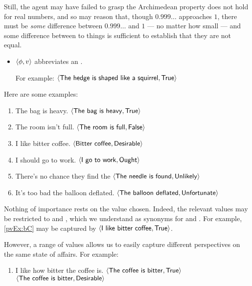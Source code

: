 \begin{note}
{    Still, the agent may have failed to grasp the Archimedean property does not hold for real numbers, and so may reason that, though \(0.999\dots\) approaches \(1\), there must be \emph{some} difference between \(0.999\dots\) and \(1\) --- no matter how small --- and some difference between to things is sufficient to establish that they are not equal.
  }

  \begin{notation}[\evalN{3}]%
    \vspace{-\baselineskip}
    \begin{itemize}[leftmargin=*]
    \item
      \(\langle \phi, v \rangle\) abbreviates an .

      For example:
      \(\pv{\prop{The hedge is shaped like a squirrel}}{\val{True}}\)
    \end{itemize}
    \vspace{-\baselineskip}
  \end{notation}
\end{note}

\begin{note}
  Here are some examples:

  \begin{enumerate}[label=\arabic*., ref=(\arabic*),noitemsep, series=propValExC]
  \item
    The bag is heavy.%
    \hfill%
    \(\pv{\prop{The bag is heavy}}{\val{True}}\)
  \item
    The room isn't full.%
    \hfill%
    \(\pv{\prop{The room is full}}{\val{False}}\)
  \item
    \label{pvEx:bC}
    I like bitter coffee.%
    \hfill%
    \(\pv{\prop{Bitter coffee}}{\val{Desirable}}\)
  \item
    I should go to work.%
    \hfill%
    \(\pv{\prop{I go to work}}{\val{Ought}}\)
  \item
    There's no chance they find the%
    \hfill%
    \(\pv{\prop{The needle is found}}{\val{Unlikely}}\)
  \item
    It's too bad the balloon deflated.%
    \hfill%
    \(\pv{\prop{The balloon deflated}}{\val{Unfortunate}}\)
  \end{enumerate}

  Nothing of importance rests on the value chosen.
  Indeed, the relevant values may be restricted to  and , which we understand as synonyms for  and .
  For example, \ref{pvEx:bC} may be captured by \(\pv{\prop{I like bitter coffee}}{\val{True}}\).

  However, a range of values allows us to easily capture different perspectives on the same state of affairs.
  For example:
  \begin{enumerate}[label=\arabic*., ref=(\arabic*),noitemsep, resume*=propValExC]
  \item I like how bitter the coffee is.%
    \hfill%
    \(\pv{\prop{The coffee is bitter}}{\val{True}}\)\newline
    \hfill%
    \(\pv{\prop{The coffee is bitter}}{\val{Desirable}}\)
  \end{enumerate}
\end{note}

